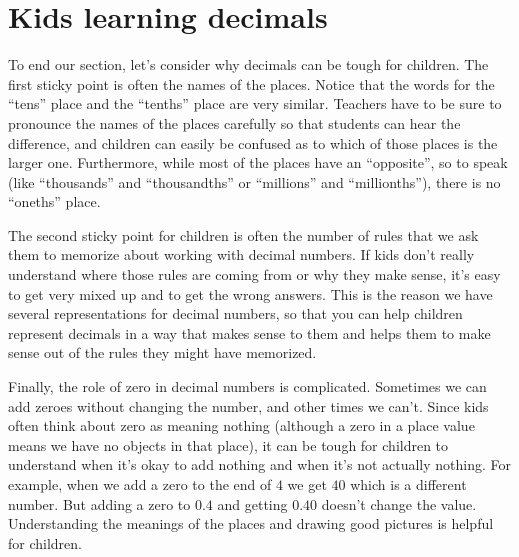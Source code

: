 \documentclass{ximera}
\begin{document}
\section{Kids learning decimals}

To end our section, let's consider why decimals can be tough for children. The first sticky point is often the names of the places. Notice that the words for the ``tens'' place and the ``tenths'' place are very similar. Teachers have to be sure to pronounce the names of the places carefully so that students can hear the difference, and children can easily be confused as to which of those places is the larger one. Furthermore, while most of the places have an ``opposite'', so to speak (like ``thousands'' and ``thousandths'' or ``millions'' and ``millionths''), there is no ``oneths'' place. 

The second sticky point for children is often the number of rules that we ask them to memorize about working with decimal numbers. If kids don't really understand where those rules are coming from or why they make sense, it's easy to get  very mixed up and to get the wrong answers. This is the reason we have several representations for decimal numbers, so that you can help children represent decimals in a way that makes sense to them and helps them to make sense out of the rules they might have memorized.

Finally, the role of zero in decimal numbers is complicated. Sometimes we can add zeroes without changing the number, and other times we can't. Since kids often think about zero as meaning nothing (although a zero in a place value means we have no objects in that place), it can be tough for children to understand when it's okay to add nothing and when it's not actually nothing. For example, when we add a zero to the end of $4$ we get $40$ which is a different number. But adding a zero to $0.4$ and getting $0.40$ doesn't change the value. Understanding the meanings of the places and drawing good pictures is helpful for children.

\end{document}
